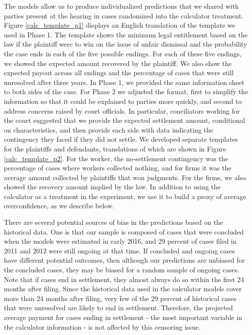 \documentclass[11pt, a4paper]{article}
\begin{document}
The models allow us to produce individualized predictions that we shared with parties present at the hearing in cases randomized into the calculator treatment. Figure \ref{calc_template_p1} displays an English translation of the template we used in Phase 1. The template shows the minimum legal entitlement based on the law if the plaintiff were to win on the issue of unfair dismissal and the probability the case ends in each of the five possible endings. For each of these five endings, we showed the expected amount recovered by the plaintiff. We also show the expected payout across all endings and the percentage of cases that were still unresolved after three years. In Phase 1, we provided the same information sheet to both sides of the case. For Phase 2 we adjusted the format, first to simplify the information so that it could be explained to parties more quickly, and second to address concerns raised by court officials. In particular, conciliators working for the court suggested that we provide the expected settlement amount, conditional on characteristics, and then provide each side with data indicating the contingency they faced if they did not settle. We developed separate templates for the plaintiffs and defendants, translations of which are shown in Figure \ref{calc_template_p2}. For the worker, the no-settlement contingency was the percentage of cases where workers collected nothing, and for firms it was the average amount collected by plaintiffs that won judgments. For the firms, we also showed the recovery amount implied by the law. In addition to using the calculator as a treatment in the experiment, we use it to build a proxy of average overconfidence, as we describe below. 

There are several potential sources of bias in the predictions based on the historical data. One is that our sample is composed of cases that were concluded when the models were estimated in early 2016, and 29 percent of cases filed in 2011 and 2012 were still ongoing at that time. If concluded and ongoing cases have different potential outcomes, then although our predictions are unbiased for the concluded cases, they may be biased for a random sample of ongoing cases. Note that if cases end in settlement, they almost always do so within the first 24 months after filing. Since the historical data used in the calculator models cover more than 24 months after filing, very few of the 29 percent of historical cases that were unresolved are likely to end in settlement. Therefore, the projected average payment for cases ending in settlement - the most important variable in the calculator information - is not affected by this censoring issue.
\end{document}
